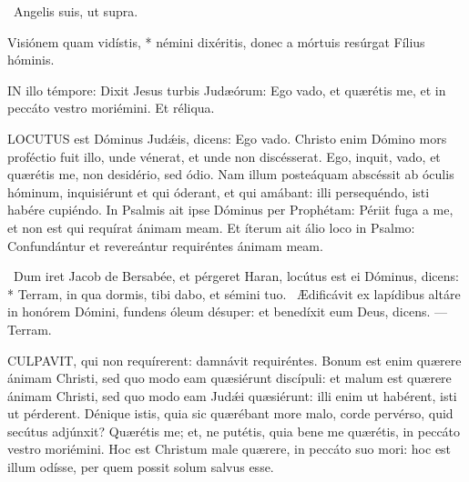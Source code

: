 

\V\ Angelis suis, ut supra.

 Visiónem quam vidístis, * némini dixéritis, donec a mórtuis resúrgat Fílius hóminis.

\sectionornament





\lettrine[lines=2]{I}{N} illo témpore: Dixit Jesus turbis Judæórum: Ego vado, et quærétis me, et in peccáto vestro moriémini. Et réliqua.



\lettrine[lines=2]{L}{OCUTUS} est Dóminus Judǽis, dicens: Ego vado. Christo enim Dómino mors proféctio fuit illo, unde vénerat, et unde non discésserat. Ego, inquit, vado, et quærétis me, non desidério, sed ódio. Nam illum posteáquam abscéssit ab óculis hóminum, inquisiérunt et qui óderant, et qui amábant: illi persequéndo, isti habére cupiéndo. In Psalmis ait ipse Dóminus per Prophétam: Périit fuga a me, et non est qui requírat ánimam meam. Et íterum ait álio loco in Psalmo: Confundántur et revereántur requiréntes ánimam meam.

\R\ Dum iret Jacob de Bersabée, et pérgeret Haran, locútus est ei Dóminus, dicens: * Terram, in qua dormis, tibi dabo, et sémini tuo. \V\ Ædificávit ex lapídibus altáre in honórem Dómini, fundens óleum désuper: et benedíxit eum Deus, dicens. --- Terram.


\lettrine[lines=2]{C}{ULPAVIT}, qui non requírerent: damnávit requiréntes. Bonum est enim quærere ánimam Christi, sed quo modo eam quæsiérunt discípuli: et malum est quærere ánimam Christi, sed quo modo eam Judǽi quæsiérunt: illi enim ut habérent, isti ut pérderent. Dénique istis, quia sic quærébant more malo, corde pervérso, quid secútus adjúnxit? Quærétis me; et, ne putétis, quia bene me quærétis, in peccáto vestro moriémini. Hoc est Christum male quærere, in peccáto suo mori: hoc est illum odísse, per quem possit solum salvus esse.

